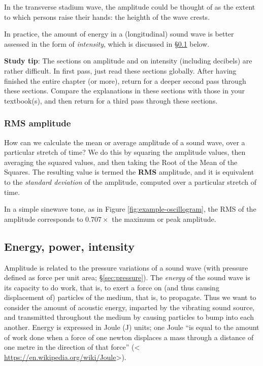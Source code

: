 \documentclass[
]{book}
\begin{document}
In the transverse stadium wave, the amplitude could be thought of as the extent to which persons raise their hands: the heighth of the wave crests.

In practice, the amount of energy in a (longitudinal) sound wave is better assessed in the form of \emph{intensity}, which is discussed in §\ref{sec:intensity} below.

\textbf{Study tip}: The sections on amplitude and on intensity (including decibels) are rather difficult. In first pass, just read these sections globally. After having finished the entire chapter (or more), return for a deeper second pass through these sections. Compare the explanations in these sections with those in your textbook(s), and then return for a third pass through these sections.

\subsubsection{RMS amplitude}\label{rms-amplitude}

How can we calculate the mean or average amplitude of a sound wave, over a particular stretch of time? We do this by squaring the amplitude values, then averaging the squared values, and then taking the Root of the Mean of the Squares. The resulting value is termed the \textbf{RMS} amplitude, and it is equivalent to the \emph{standard deviation} of the amplitude, computed over a particular stretch of time.

In a simple sinewave tone, as in Figure \ref{fig:example-oscillogram}, the RMS of the amplitude corresponds to \(0.707 \times\) the maximum or peak amplitude.

\subsection{Energy, power, intensity}\label{sec:intensity}

Amplitude is related to the pressure variations of a sound wave (with pressure defined as force per unit area; §\ref{sec:pressure}). The \emph{energy} of the sound wave is its capacity to do work, that is, to exert a force on (and thus causing displacement of) particles of the medium, that is, to propagate. Thus we want to consider the amount of acoustic energy, imparted by the vibrating sound source, and transmitted throughout the medium by causing particles to bump into each another. Energy is expressed in Joule (J) units; one Joule ``is equal to the amount of work done when a force of one newton displaces a mass through a distance of one metre in the direction of that force'' (\textless{} \url{https://en.wikipedia.org/wiki/Joule}\textgreater).
\end{document}
